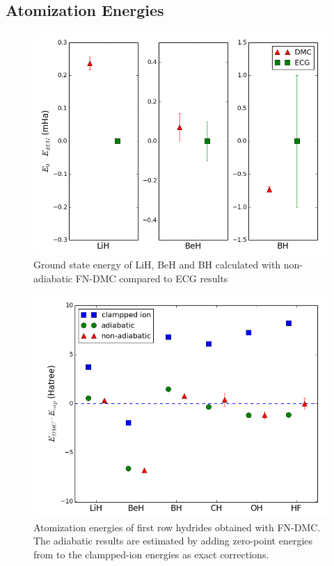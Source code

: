 \documentclass[pra,superscriptaddress,groupedaddress,twocolumn]{revtex4}
\begin{document}


\subsection{Atomization Energies}

\begin{figure}
\centering
\includegraphics[scale=.4]{Figures/dia-ECG}
\caption{Ground state energy of LiH, BeH and BH calculated with non-adiabatic FN-DMC compared to ECG results}
\end{figure}

\begin{figure}
\centering
\includegraphics[scale=.4]{Figures/atomization}
\caption{Atomization energies of first row hydrides obtained with FN-DMC. The adiabatic results are estimated by adding zero-point energies from \cite{Feller_Corrections} to the clampped-ion energies as exact corrections.}
\end{figure}
\end{document}
